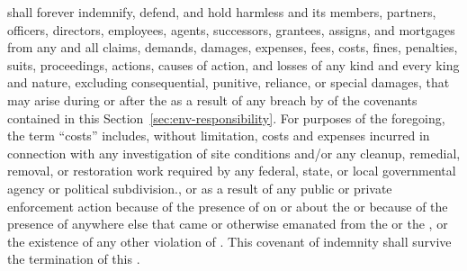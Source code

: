 \lessee shall forever indemnify, defend, and hold harmless \lessor and its members, partners, officers, directors, employees, agents, successors, grantees, assigns, and mortgages from any and all claims, demands, damages, expenses, fees, costs, fines, penalties, suits, proceedings, actions, causes of action, and losses of any kind and every king and nature, excluding consequential, punitive, reliance, or special damages, that may arise during or after the \termOfLease as a result of any breach by \lessee of the covenants contained in this Section~\ref{sec:env-responsibility}. For purposes of the foregoing, the term ``costs'' includes, without limitation, costs and expenses incurred in connection with any investigation of site conditions and/or any cleanup, remedial, removal, or restoration work required by any federal, state, or local governmental agency or political subdivision., or as a result of any public or private enforcement action because of the presence of \hazardousSubstances on or about the \building or because of the presence of \hazardousSubstances anywhere else that came or otherwise emanated from the \building or the \premises, or the existence of any other violation of \environmentalLaws. This covenant of indemnity shall survive the termination of this \lease.
